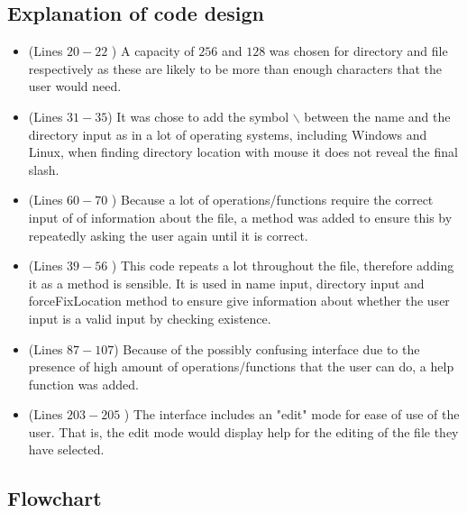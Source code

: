 \documentclass[a4paper]{article}
\theoremstyle{plain}
\theoremstyle{definition}
\theoremstyle{remark}
\begin{document}
\subsection{Explanation of code design}
\begin{itemize}
	\item (Lines $20-22$ ) A capacity of $256$ and $128$ was chosen for directory and file respectively as these are likely to be more than enough characters that the user would need.
	\item (Lines $31-35$) It was chose to add the symbol $\backslash$ between the name and the directory input as in a lot of operating systems, including Windows and Linux, when finding directory location with mouse it does not reveal the final slash.
	\item (Lines $60-70$ ) Because a lot of operations/functions require the correct input of of information about the file, a method was added to ensure this by repeatedly asking the user again until it is correct.
	\item (Lines $39-56$ ) This code repeats a lot throughout the file, therefore adding it as a method is sensible. It is used in name input, directory input and forceFixLocation method to ensure give information about whether the user input is a valid input by checking existence.
	\item (Lines $87-107$) Because of the possibly confusing interface due to the presence of high amount of operations/functions that the user can do, a help function was added.
	\item (Lines $203-205$ ) The interface includes an "edit" mode for ease of use of the user. That is, the edit mode would display help for the editing of the file they have selected.
	
\end{itemize}
\subsection{Flowchart}


\newpage


	
\end{document}
